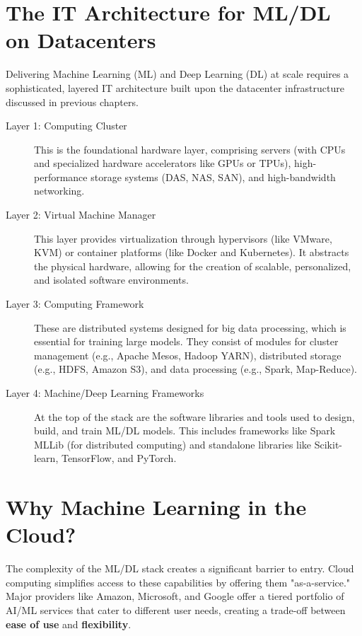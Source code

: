 \section{The IT Architecture for ML/DL on Datacenters}

Delivering Machine Learning (ML) and Deep Learning (DL) at scale requires a sophisticated, layered IT architecture built upon the datacenter infrastructure discussed in previous chapters.


\begin{description}
    \item[Layer 1: Computing Cluster] This is the foundational hardware layer, comprising servers (with CPUs and specialized hardware accelerators like GPUs or TPUs), high-performance storage systems (DAS, NAS, SAN), and high-bandwidth networking.
    \item[Layer 2: Virtual Machine Manager] This layer provides virtualization through hypervisors (like VMware, KVM) or container platforms (like Docker and Kubernetes). It abstracts the physical hardware, allowing for the creation of scalable, personalized, and isolated software environments.
    \item[Layer 3: Computing Framework] These are distributed systems designed for big data processing, which is essential for training large models. They consist of modules for cluster management (e.g., Apache Mesos, Hadoop YARN), distributed storage (e.g., HDFS, Amazon S3), and data processing (e.g., Spark, Map-Reduce).
    \item[Layer 4: Machine/Deep Learning Frameworks] At the top of the stack are the software libraries and tools used to design, build, and train ML/DL models. This includes frameworks like Spark MLLib (for distributed computing) and standalone libraries like Scikit-learn, TensorFlow, and PyTorch.
\end{description}

\section{Why Machine Learning in the Cloud?}

The complexity of the ML/DL stack creates a significant barrier to entry. Cloud computing simplifies access to these capabilities by offering them "as-a-service." Major providers like Amazon, Microsoft, and Google offer a tiered portfolio of AI/ML services that cater to different user needs, creating a trade-off between \textbf{ease of use} and \textbf{flexibility}.

